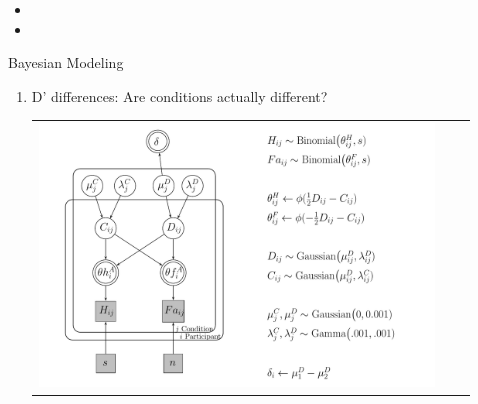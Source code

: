 \documentclass[final]{beamer}
\newlength{\sepwid}
\newlength{\onecolwid}
\newlength{\twocolwid}
\begin{document}
\begin{frame}[t]
\begin{columns}[t]
\begin{column}{\twocolwid}
\begin{columns}[t,totalwidth=\twocolwid]
\begin{column}{\onecolwid}
\end{column} %

\begin{column}{\sepwid}\end{column} %
\begin{column}{\onecolwid}\vspace{-2.1in} %


\begin{itemize}
\item
\item
\end{itemize}



\begin{alertblock}{Bayesian Modeling}


\begin{enumerate}
\item D' differences: Are conditions actually different?
\begin{center}
\begin{tabular}{ccc}
\includegraphics[width=0.65\linewidth]{Figures/Delta_DiffD_Model4.pdf}
\end{tabular}
\end{center}


\end{enumerate}
\end{alertblock}
\end{column}
\end{columns}
\end{column}
\end{columns}
\end{frame}
\end{document}

